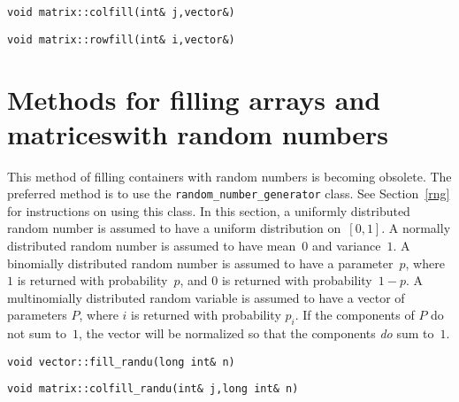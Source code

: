   
\begin{lstlisting}
void matrix::colfill(int& j,vector&)
\end{lstlisting}

\begin{lstlisting}
void matrix::rowfill(int& i,vector&)
\end{lstlisting}


\section{Methods for filling arrays and matrices\br with random numbers}

This method of filling containers with random numbers is becoming
obsolete. The preferred method is to use the
\texttt{random\_number\_generator} class.
See Section~\ref{rng} for instructions on using this class.
In this section, a uniformly distributed random number is assumed to have
a uniform distribution on~$[0,1]$. A normally distributed random number
is assumed to have mean~$0$ and variance~$1$.
A binomially distributed random number is assumed to have a parameter~$p$,
where $1$ is returned with probability~$p$, and $0$ is returned with
probability~$1-p$.
A multinomially distributed random variable is assumed to have a vector
of parameters $P$, where $i$ is returned with probability $p_i$.
If the components of $P$ do not sum to~$1$, the vector will be normalized
so that the components {\it do} sum to~$1$.

  
\begin{lstlisting}
void vector::fill_randu(long int& n)
\end{lstlisting}

\begin{lstlisting}
void matrix::colfill_randu(int& j,long int& n)
\end{lstlisting}

